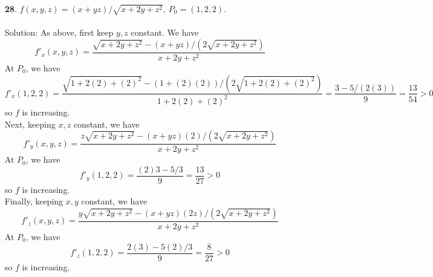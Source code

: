 \documentclass[12pt]{amsbook}
\begin{document}
\begin{enumerate}
{\sc Solution}: As above, first keep $y,z$ constant. We have
$$f'_x(x,y,z)=\frac{z(x+y^2)-zx(1)}{(x+y^2)^2}=\frac{zy^2}{(x+y^2)^2}$$
At $P_0$, we have
$$f'_x(1,1,1)=\frac{(1)(1)^2}{(1+(1)^2)^2}=\frac{1}{4}>0$$
so $f$ is increasing.
\\
Next, keeping $x,z$ constant, we have
$$f'_y(x,y,z)=\frac{zx(-2y))}{(x+y^2)^2}$$
At $P_0$, we have
$$f'_y(1,1,1)=-\frac{2(1)(1)(1)}{(1+(1)^2)^2}=-\frac{2}{4}=-\frac{1}{2}<0$$
so $f$ is decreasing.
\\
Finally, keeping $x,y$ constant, we have
$$f'_z(x,y,z)=\frac{x}{x+y^2}$$
At $P_0$, we have
$$f'_z(1,1,1)=\frac{1}{1+(1)^2}=\frac{1}{2}>0$$
so $f$ is increasing.
\\
\item[{\small\bf 28}.] $f(x,y,z)=(x+yz)/\sqrt{x+2y+z^2} , \ P_0=(1,2,2)$.
\\
\\
{\sc Solution}: As above, first keep $y,z$ constant. We have
$$f'_x(x,y,z)=\frac{\sqrt{x+2y+z^2}-(x+yz)/(2\sqrt{x+2y+z^2})}{x+2y+z^2}$$
At $P_0$, we have
$$f'_x(1,2,2)=\frac{\sqrt{1+2(2)+(2)^2}-(1+(2)(2))/(2\sqrt{1+2(2)+(2)^2})}{1+2(2)+(2)^2}=\frac{3-5/(2(3))}{9}=\frac{13}{54}>0$$
so $f$ is increasing.
\\
Next, keeping $x,z$ constant, we have
$$f'_y(x,y,z)=\frac{z\sqrt{x+2y+z^2}-(x+yz)(2)/(2\sqrt{x+2y+z^2})}{x+2y+z^2}$$
At $P_0$, we have
$$f'_y(1,2,2)=\frac{(2)3-5/3}{9}=\frac{13}{27}>0$$
so $f$ is increasing.
\\
Finally, keeping $x,y$ constant, we have
$$f'_z(x,y,z)=\frac{y\sqrt{x+2y+z^2}-(x+yz)(2z)/(2\sqrt{x+2y+z^2})}{x+2y+z^2}$$
At $P_0$, we have
$$f'_z(1,2,2)=\frac{2(3)-5(2)/3}{9}=\frac{8}{27}>0$$
so $f$ is increasing.
\end{enumerate}


\newpage
\end{document}
